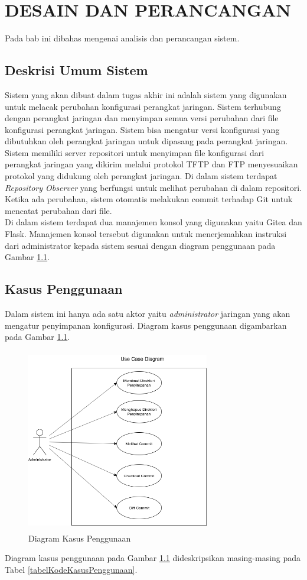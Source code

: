 \chapter{DESAIN DAN PERANCANGAN}
    Pada bab ini dibahas mengenai analisis dan perancangan sistem.
    
    \section{Deskrisi Umum Sistem}
    	Sistem yang akan dibuat dalam tugas akhir ini adalah sistem yang digunakan untuk melacak perubahan konfigurasi perangkat jaringan. Sistem terhubung dengan perangkat jaringan dan menyimpan semua versi perubahan dari file konfigurasi perangkat jaringan. Sistem bisa mengatur versi konfigurasi yang dibutuhkan oleh perangkat jaringan untuk dipasang pada perangkat jaringan.\\
    	
    	\indent Sistem memiliki server repositori untuk menyimpan file konfigurasi dari perangkat jaringan yang dikirim melalui protokol TFTP dan FTP menyesuaikan protokol yang didukung oleh perangkat jaringan. Di dalam sistem terdapat \textit{Repository Observer} yang berfungsi untuk melihat perubahan di dalam repositori. Ketika ada perubahan, sistem otomatis melakukan commit terhadap Git untuk mencatat perubahan dari file.\\
    	
    	\indent Di dalam sistem terdapat dua manajemen konsol yang digunakan yaitu Gitea dan Flask. Manajemen konsol tersebut digunakan untuk menerjemahkan instruksi dari administrator kepada sistem sesuai dengan diagram penggunaan pada Gambar \ref{usecase}. 
	
    \section{Kasus Penggunaan}
    	Dalam sistem ini hanya ada satu aktor yaitu \textit{administrator} jaringan yang akan mengatur penyimpanan konfigurasi. Diagram kasus penggunaan digambarkan pada Gambar \ref{usecase}.
        \begin{figure}[H]
			\centering
			\includegraphics[width=8cm,height=8cm]{Images/C-3/UC-2.png}
			\caption{Diagram Kasus Penggunaan}
			\label{usecase}
		\end{figure}
        \indent Diagram kasus penggunaan pada Gambar \ref{usecase} dideskripsikan masing-masing pada Tabel \ref {tabelKodeKasusPenggunaan}.
        
